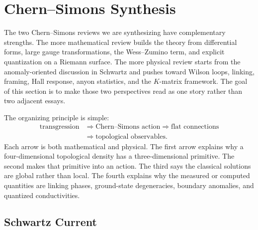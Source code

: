 
\providecommand{\dd}{\mathrm{d}}
\providecommand{\Tr}{\operatorname{Tr}}
\providecommand{\tr}{\operatorname{tr}}
\providecommand{\CS}{\operatorname{CS}}
\providecommand{\Hom}{\operatorname{Hom}}
\providecommand{\U}{\operatorname{U}}
\providecommand{\SU}{\operatorname{SU}}
\providecommand{\Lk}{\operatorname{Lk}}

\section{Chern--Simons Synthesis}
\label{sec:cs-two-review-synthesis}

The two Chern--Simons reviews we are synthesizing have complementary strengths. The more mathematical review builds the theory from differential forms, large gauge transformations, the Wess--Zumino term, and explicit quantization on a Riemann surface. The more physical review starts from the anomaly-oriented discussion in Schwartz and pushes toward Wilson loops, linking, framing, Hall response, anyon statistics, and the $K$-matrix framework. The goal of this section is to make those two perspectives read as one story rather than two adjacent essays.

The organizing principle is simple:
\[
\begin{aligned}
  \text{transgression}
  &\Longrightarrow
  \text{Chern--Simons action}
  \Longrightarrow
  \text{flat connections}
  \\
  &\Longrightarrow
  \text{topological observables}.
\end{aligned}
\]
Each arrow is both mathematical and physical. The first arrow explains why a four-dimensional topological density has a three-dimensional primitive. The second makes that primitive into an action. The third says the classical solutions are global rather than local. The fourth explains why the measured or computed quantities are linking phases, ground-state degeneracies, boundary anomalies, and quantized conductivities.


\subsection{Schwartz Current}
\label{subsec:synthesis-schwartz-bridge}

